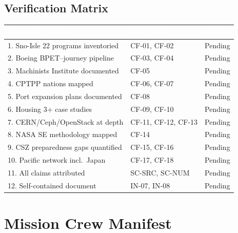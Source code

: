\documentclass[11pt,letterpaper]{article}
\newcommand{\tableheader}[1]{\textbf{\sffamily\textcolor{white}{#1}}}
\begin{document}
\subsection{Verification Matrix}

\begin{center}
\begin{tabularx}{\textwidth}{XL{3cm}C{1.5cm}}
\toprule
{}
\tableheader{Success Criterion} & \tableheader{Test ID(s)} & \tableheader{Status} \\
. Sno-Isle 22 programs inventoried & CF-01, CF-02 & Pending \\
2. Boeing BPET--journey pipeline & CF-03, CF-04 & Pending \\
3. Machinists Institute documented & CF-05 & Pending \\
4. CPTPP nations mapped & CF-06, CF-07 & Pending \\
5. Port expansion plans documented & CF-08 & Pending \\
6. Housing 3+ case studies & CF-09, CF-10 & Pending \\
7. CERN/Ceph/OpenStack at depth & CF-11, CF-12, CF-13 & Pending \\
8. NASA SE methodology mapped & CF-14 & Pending \\
9. CSZ preparedness gaps quantified & CF-15, CF-16 & Pending \\
10. Pacific network incl.\ Japan & CF-17, CF-18 & Pending \\
11. All claims attributed & SC-SRC, SC-NUM & Pending \\
12. Self-contained document & IN-07, IN-08 & Pending \\
\bottomrule
\end{tabularx}
\end{center}

\section{Mission Crew Manifest}
\end{document}
